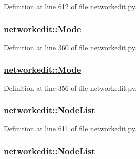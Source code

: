 Definition at line 612 of file networkedit.py.\hypertarget{namespacenetworkedit_6d69d76b8b1b34286bca7d797b7d9053}{
\subsubsection[Mode]{\setlength{\rightskip}{0pt plus 5cm}\hyperlink{namespacenetworkedit_6d69d76b8b1b34286bca7d797b7d9053}{networkedit::Mode}}}
\label{namespacenetworkedit_6d69d76b8b1b34286bca7d797b7d9053}




Definition at line 360 of file networkedit.py.\hypertarget{namespacenetworkedit_6d69d76b8b1b34286bca7d797b7d9053}{
\subsubsection[Mode]{\setlength{\rightskip}{0pt plus 5cm}\hyperlink{namespacenetworkedit_6d69d76b8b1b34286bca7d797b7d9053}{networkedit::Mode}}}
\label{namespacenetworkedit_6d69d76b8b1b34286bca7d797b7d9053}




Definition at line 356 of file networkedit.py.\hypertarget{namespacenetworkedit_6a4290ba38225a18362b4ef9a9463b80}{
\subsubsection[NodeList]{\setlength{\rightskip}{0pt plus 5cm}\hyperlink{namespacenetworkedit_6a4290ba38225a18362b4ef9a9463b80}{networkedit::Node\-List}}}
\label{namespacenetworkedit_6a4290ba38225a18362b4ef9a9463b80}




Definition at line 611 of file networkedit.py.\hypertarget{namespacenetworkedit_6a4290ba38225a18362b4ef9a9463b80}{
\subsubsection[NodeList]{\setlength{\rightskip}{0pt plus 5cm}\hyperlink{namespacenetworkedit_6a4290ba38225a18362b4ef9a9463b80}{networkedit::Node\-List}}}
\label{namespacenetworkedit_6a4290ba38225a18362b4ef9a9463b80}




